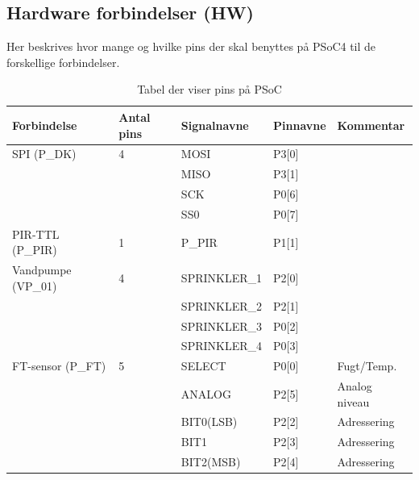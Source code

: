 
\begin{table}[H]
\subsection{Hardware forbindelser (HW)}
Her beskrives hvor mange og hvilke pins der skal benyttes på PSoC4 til de forskellige forbindelser.
\caption{Tabel der viser pins på PSoC}
\begin{small}
\begin{tabular}{|p{}|p{2cm}|p{}|p{}|p{2.6cm}|}
\hline

\textbf{Forbindelse}	&\textbf{Antal pins} 	&\textbf{Signalnavne} &\textbf{Pinnavne} &\textbf{Kommentar}  \\ \hline

SPI 	(P\_DK)			&4 						&MOSI				&P3[0]		&					\\\cline{3-4}
					&						&MISO				&P3[1]		&					\\\cline{3-4}
					&						&SCK					&P0[6]		&					\\\cline{3-4}
					&						&SS0					&P0[7]		&					\\\hline
	
PIR-TTL	(P\_PIR)		&1 						&P\_PIR				&P1[1] 		&					\\\hline

Vandpumpe (VP\_01)	&4 						&SPRINKLER\_1		&P2[0]		&					\\\cline{3-4}
					&						&SPRINKLER\_2		&P2[1]		&					\\\cline{3-4}
					&						&SPRINKLER\_3		&P0[2]		&					\\\cline{3-4}
					&						&SPRINKLER\_4		&P0[3]		&					\\\hline
		
FT-sensor (P\_FT)	&5						&SELECT				&P0[0]		&Fugt/Temp.			\\\cline{3-5}
					&						&ANALOG				&P2[5]		&Analog niveau		\\\cline{3-5}
					&						&BIT0(LSB)			&P2[2]		&Adressering			\\\cline{3-5}
					&						&BIT1				&P2[3]		&Adressering			\\\cline{3-5}
					&						&BIT2(MSB)			&P2[4]		&Adressering			\\\hline			
					

\end{tabular}
\end{small}
\end{table}
